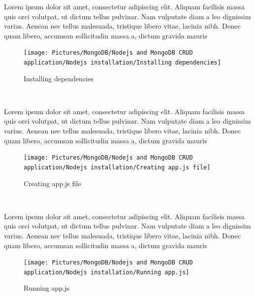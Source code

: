 \begin{spacing}{1.2}
\par Lorem ipsum dolor sit amet, consectetur adipiscing elit. Aliquam facilisis massa quis orci volutpat, ut dictum tellus pulvinar. Nam vulputate diam a leo dignissim varius. Aenean nec tellus malesuada, tristique libero vitae, lacinia nibh. Donec quam libero, accumsan sollicitudin massa a, dictum gravida mauris
\\
\begin{figure}[!htb] 
\begin{center} 
\texttt{[image: Pictures/MongoDB/Nodejs and MongoDB CRUD  application/Nodejs installation/Installing dependencies]} 
\end{center} 
\caption{Installing dependencies} 
\end{figure}  \FloatBarrier
\\

\par Lorem ipsum dolor sit amet, consectetur adipiscing elit. Aliquam facilisis massa quis orci volutpat, ut dictum tellus pulvinar. Nam vulputate diam a leo dignissim varius. Aenean nec tellus malesuada, tristique libero vitae, lacinia nibh. Donec quam libero, accumsan sollicitudin massa a, dictum gravida mauris
\\
\begin{figure}[!htb] 
\begin{center} 
\texttt{[image: Pictures/MongoDB/Nodejs and MongoDB CRUD  application/Nodejs installation/Creating app.js file]} 
\end{center} 
\caption{Creating app.js file} 
\end{figure}  \FloatBarrier
\\

\par Lorem ipsum dolor sit amet, consectetur adipiscing elit. Aliquam facilisis massa quis orci volutpat, ut dictum tellus pulvinar. Nam vulputate diam a leo dignissim varius. Aenean nec tellus malesuada, tristique libero vitae, lacinia nibh. Donec quam libero, accumsan sollicitudin massa a, dictum gravida mauris
\\
\begin{figure}[!htb] 
\begin{center} 
\texttt{[image: Pictures/MongoDB/Nodejs and MongoDB CRUD  application/Nodejs installation/Running app.js]} 
\end{center} 
\caption{Running app.js} 
\end{figure}  \FloatBarrier
\\

\end{spacing}

